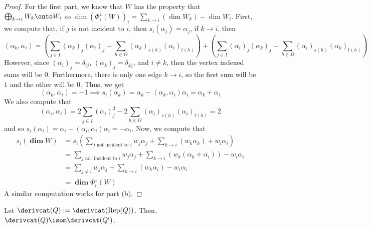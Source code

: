 \documentclass[11pt,leqno,oneside]{amsbook}
\numberwithin{thm}{section}
\newcommand{\Rep}{\operatorname{Rep}} %
\renewcommand{\Q}{Q} %
\newcommand{\grdim}{\boldsymbol{\dim}} %
\newcommand{\sinktosourcefunc}{\Phi^\downarrow} %
\begin{document}
\begin{proof}
  For the first part, we know that \(W\) has the property that
  \(\bigoplus_{k \to i} W_k \onto W_i\) so \(\dim
  (\sinktosourcefunc_i(W))_i = \sum_{k \to i} (\dim W_k) - \dim W_i\). First,
  we compute that, if \(j\) is not incident to \(i\), then \(s_i(\alpha_j) =
  \alpha_j\), if \(k \to i\), then \[
    (\alpha_k, \alpha_i) = \left(\sum_{j \in I} (\alpha_k)_j (\alpha_i)_j -
    \sum_{h \in \Omega} (\alpha_k)_{s(h)} (\alpha_i)_{t(h)} \right) +
  \left(
    \sum_{j \in I} (\alpha_i)_j (\alpha_k)_j -
    \sum_{h \in \Omega} (\alpha_i)_{s(h)} (\alpha_k)_{t(h)}
  \right)    
\]
However, since \((\alpha_i)_j = \delta_{ij}\), \((\alpha_k)_j =
\delta_{kj}\), and \(i \neq k\), then the vertex indexed sums will be
0. Furthermore, there is only one edge \(k \to i\), so the first sum
will be \(1\) and the other will be \(0\). Thus, we get \[
  (\alpha_k, \alpha_i) = -1 \implies s_i(\alpha_k) = \alpha_k -
  (\alpha_k, \alpha_i) \alpha_i = \alpha_k + \alpha_i
\]
We also compute that \[
  (\alpha_i, \alpha_i) = 2 \sum_{j \in I} (\alpha_i)_j^2 - 2 \sum_{h
    \in \Omega} (\alpha_i)_{s(h)} (\alpha_i)_{t(h)} = 2
\]
  and so \(s_i(\alpha_i) = \alpha_i - (\alpha_i,\alpha_i) \alpha_i =
  -\alpha_i\). 
  Now, we compute that
  \begin{align*}
    s_i(\grdim W)
    & = s_i \left( \sum_{j \text{ not incident to }i} w_j
      \alpha_j  + \sum_{k \to i}(w_k \alpha_k) + w_i \alpha_i 
      \right)  \\
    & = \sum_{j \text{ not incident to }i} w_j \alpha_j + \sum_{k \to i}( w_k (\alpha_k + \alpha_i)) - w_i \alpha_i \\
    & = \sum_{j \neq i} w_j \alpha_j + \sum_{k \to i}( w_k \alpha_i )
      - w_i \alpha_i \\
    & = \grdim \sinktosourcefunc_i(W)
  \end{align*}
  A similar computation works for part (b).
\end{proof}
\begin{rmk}
  Let \(\derivcat(\Q) := \derivcat(\Rep(\Q))\). Then, \(\derivcat(\Q)
  \isom \derivcat(\Q')\). 
\end{rmk}
\end{document}

